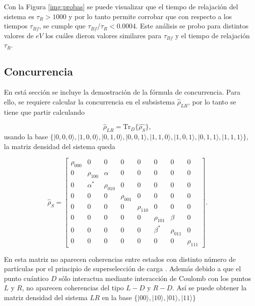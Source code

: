 \begin{appendixs}

Con la Figura \ref{img:probas} se puede visualizar que el tiempo de relajación del sistema es $\tau_{R}>1000$ y por lo tanto permite corrobar que con respecto a los tiempos $\tau_{Bf}$, se cumple que $\tau_{Bf}/\tau_{R} < 0.0004 $. Este análisis se probo para distintos valores de $eV$ los cuáles dieron valores similares para $\tau_{Bf}$ y el tiempo de relajación $\tau_{R}$. 

\label{appendix5tauf}

\newpage 

\subsection{Concurrencia}
En está sección se incluye la demostración de la fórmula de concurrencia. Para ello, se requiere calcular la concurrencia en el subsistema $\hat{\rho}_{LR}$, por lo tanto se tiene que partir calculando 

\begin{equation*}
    \hat{\rho}_{LR} = \text{Tr}_{D}\{ \hat{\rho_{S}} \},
\end{equation*}
usando la base $\{|0,0,0\rangle, |1,0,0\rangle, |0,1,0\rangle, |0,0,1\rangle, |1,1,0\rangle, |1,0,1\rangle, |0,1,1\rangle, |1,1,1\rangle\}$, la matriz densidad del sistema queda

\begin{equation}
    \hat{\rho}_{S} = 
    \begin{bmatrix}
        \rho_{000} & 0 & 0 & 0 & 0 & 0 & 0 & 0 \\
        0 & \rho_{100} & \alpha & 0 & 0 & 0 & 0 & 0 \\
        0 & \alpha^{*} & \rho_{010} & 0 & 0 & 0 & 0 & 0 \\
        0 & 0 & 0 & \rho_{001} & 0 & 0 & 0 & 0 \\
        0 & 0 & 0 & 0 & \rho_{110} & 0 & 0 & 0 \\
        0 & 0 & 0 & 0 & 0 & \rho_{101} & \beta & 0 \\
        0 & 0 & 0 & 0 & 0 & \beta^{*} & \rho_{011} & 0 \\
        0 & 0 & 0 & 0 & 0 & 0 & 0 & \rho_{111} 
        \end{bmatrix}.
        \label{appendix5rhoconcu}
\end{equation}

En esta matriz no aparecen coherencias entre estados con distinto número de partículas por el principio de superselección de carga \cite{bartlett2007reference,wick1997intrinsic}. Además debido a que el punto cuántico $D$ sólo interactua mediante interacción de Coulomb con los puntos $L$ y $R$, no aparecen coherencias del tipo $L-D$ y $R-D$. Así se puede obtener la matriz densidad del sistema $LR$ en la base $\{|00\rangle, |10\rangle, |01\rangle, |11\rangle \}$


\end{appendixs}
